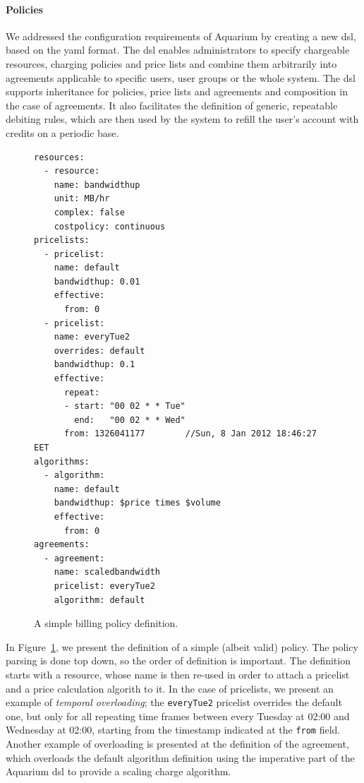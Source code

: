 \documentclass[letterpaper,twocolumn,10pt]{article}
\begin{document}
\paragraph{Policies}
We addressed the configuration requirements of Aquarium by creating a
new {\sc dsl}, based on the {\sc yaml} format. The {\sc dsl} enables
administrators to specify chargeable resources, charging policies and
price lists and combine them arbitrarily into agreements applicable to
specific users, user groups or the whole system. The {\sc dsl}
supports inheritance for policies, price lists and agreements and
composition in the case of agreements. It also facilitates the
definition of generic, repeatable debiting rules, which are then used
by the system to refill the user's account with credits on a periodic
base.

\begin{figure}
\lstset{language=c, basicstyle=\footnotesize,
stringstyle=\ttfamily, 
flexiblecolumns=true, aboveskip=-0.9em, belowskip=0em, lineskip=0em}

\begin{lstlisting}
resources:
  - resource:
    name: bandwidthup
    unit: MB/hr
    complex: false
    costpolicy: continuous
pricelists:
  - pricelist: 
    name: default
    bandwidthup: 0.01
    effective:
      from: 0
  - pricelist: 
    name: everyTue2
    overrides: default
    bandwidthup: 0.1
    effective:
      repeat:
      - start: "00 02 * * Tue"
        end:   "00 02 * * Wed"
      from: 1326041177        //Sun, 8 Jan 2012 18:46:27 EET
algorithms:
  - algorithm:
    name: default
    bandwidthup: $price times $volume
    effective:
      from: 0
agreements:
  - agreement:
    name: scaledbandwidth
    pricelist: everyTue2
    algorithm: default
\end{lstlisting}
\caption{A simple billing policy definition.} 
\label{fig:dsl}
\end{figure}

In Figure~\ref{fig:dsl}, we present the definition of a simple (albeit valid) 
policy. The policy parsing is done top down, so the order of definition 
is important. The definition starts with a resource, whose name is then
re-used in order to attach a pricelist and a price calculation algorith to it.
In the case of pricelists, we present an example of \emph{temporal overloading};
the \texttt{everyTue2} pricelist overrides the default one, but only for 
all repeating time frames between every Tuesday at 02:00 and Wednesday at
02:00, starting from the timestamp indicated at the \texttt{from} field. Another
example of overloading is presented at the definition of the agreement, which
overloads the default algorithm definition using the imperative part of the
Aquarium {\sc dsl} to provide a scaling charge algorithm.
\end{document}
